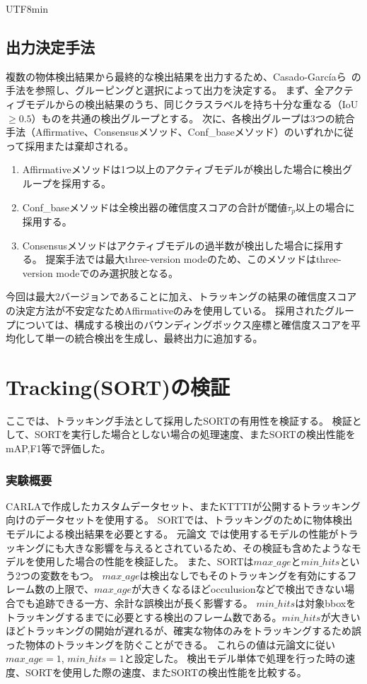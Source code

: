 \documentclass[conference, dvipdfmx]{IEEEtran}
\begin{document}
\begin{CJK}{UTF8}{min}
\subsection{出力決定手法}
\label{integrate output}
複数の物体検出結果から最終的な検出結果を出力するため、Casado-Garc\'iaら~\cite{CasadoGarcia2020}の手法を参照し、グルーピングと選択によって出力を決定する。
まず、全アクティブモデルからの検出結果のうち、同じクラスラベルを持ち十分な重なる（IoU $\geq 0.5$）ものを共通の検出グループとする。
次に、各検出グループは3つの統合手法（Affirmative、Consensusメソッド、Conf\_baseメソッド）のいずれかに従って採用または棄却される。

\begin{enumerate}
    \item Affirmativeメソッドは1つ以上のアクティブモデルが検出した場合に検出グループを採用する。
    \item Conf\_baseメソッドは全検出器の確信度スコアの合計が閾値$\tau_p$以上の場合に採用する。
    \item Consensusメソッドはアクティブモデルの過半数が検出した場合に採用する。
    提案手法では最大three-version modeのため、このメソッドはthree-version modeでのみ選択肢となる。
\end{enumerate}

今回は最大2バージョンであることに加え、トラッキングの結果の確信度スコアの決定方法が不安定なためAffirmativeのみを使用している。
採用されたグループについては、構成する検出のバウンディングボックス座標と確信度スコアを平均化して単一の統合検出を生成し、最終出力に追加する。

\section{Tracking(SORT)の検証}
ここでは、トラッキング手法として採用したSORTの有用性を検証する。
検証として、SORTを実行した場合としない場合の処理速度、またSORTの検出性能をmAP,F1等で評価した。

\subsubsection{実験概要}
CARLAで作成したカスタムデータセット、またKTTTIが公開するトラッキング向けのデータセットを使用する。
SORTでは、トラッキングのために物体検出モデルによる検出結果を必要とする。
元論文 \cite{SORT}では使用するモデルの性能がトラッキングにも大きな影響を与えるとされているため、その検証も含めたようなモデルを使用した場合の性能を検証した。
また、SORTは$max\_age$と$min\_hits$という2つの変数をもつ。
$max\_age$は検出なしでもそのトラッキングを有効にするフレーム数の上限で、$max\_age$が大きくなるほどocculusionなどで検出できない場合でも追跡できる一方、余計な誤検出が長く影響する。
$min\_hits$は対象bboxをトラッキングするまでに必要とする検出のフレーム数である。$min\_hits$が大きいほどトラッキングの開始が遅れるが、確実な物体のみをトラッキングするため誤った物体のトラッキングを防ぐことができる。
これらの値は元論文に従い$max\_age=1$, $min\_hits=1$と設定した。
検出モデル単体で処理を行った時の速度、SORTを使用した際の速度、またSORTの検出性能を比較する。


\end{CJK}
\end{document}
